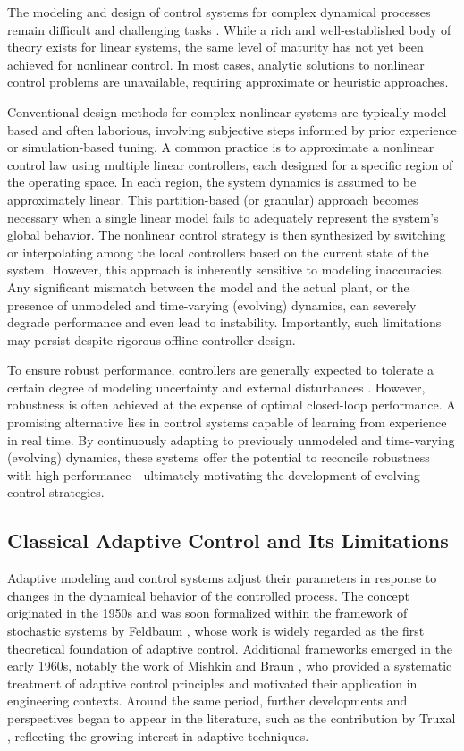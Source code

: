 \documentclass[conference]{IEEEtran}
\begin{document}
The modeling and design of control systems for complex dynamical processes remain difficult and challenging tasks \cite{khalil2002, CoppHespanha2017}. While a rich and well-established body of theory exists for linear systems, the same level of maturity has not yet been achieved for nonlinear control. In most cases, analytic solutions to nonlinear control problems are unavailable, requiring approximate or heuristic approaches.

Conventional design methods for complex nonlinear systems are typically model-based and often laborious, involving subjective steps informed by prior experience or simulation-based tuning. A common practice is to approximate a nonlinear control law using multiple linear controllers, each designed for a specific region of the operating space. In each region, the system dynamics is assumed to be approximately linear. This partition-based (or granular) approach becomes necessary when a single linear model fails to adequately represent the system's global behavior. The nonlinear control strategy is then synthesized by switching or interpolating among the local controllers based on the current state of the system. However, this approach is inherently sensitive to modeling inaccuracies. Any significant mismatch between the model and the actual plant, or the presence of unmodeled and time-varying (evolving) dynamics, can severely degrade performance and even lead to instability. Importantly, such limitations may persist despite rigorous offline controller design.

To ensure robust performance, controllers are generally expected to tolerate a certain degree of modeling uncertainty and external disturbances \cite{bernal2022}. However, robustness is often achieved at the expense of optimal closed-loop performance. A promising alternative lies in control systems capable of learning from experience in real time. By continuously adapting to previously unmodeled and time-varying (evolving) dynamics, these systems offer the potential to reconcile robustness with high performance—ultimately motivating the development of evolving control strategies.

\subsection{Classical Adaptive Control and Its Limitations}

Adaptive modeling and control systems adjust their parameters in response to changes in the dynamical behavior of the controlled process. The concept originated in the 1950s \cite{aseltine1958} and was soon formalized within the framework of stochastic systems by Feldbaum \cite{feldbaum1960}, whose work is widely regarded as the first theoretical foundation of adaptive control. Additional frameworks emerged in the early 1960s, notably the work of Mishkin and Braun \cite{mishkin1961}, who provided a systematic treatment of adaptive control principles and motivated their application in engineering contexts. Around the same period, further developments and perspectives began to appear in the literature, such as the contribution by Truxal \cite{truxal1963}, reflecting the growing interest in adaptive techniques.
\end{document}
